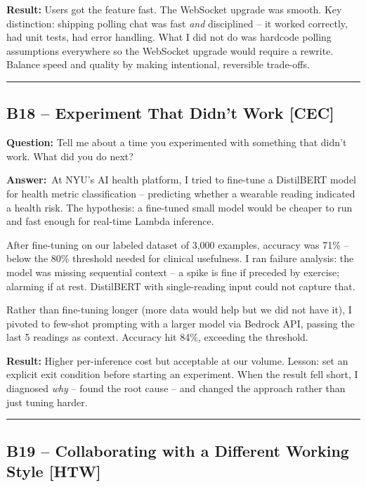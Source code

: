 \documentclass[letterpaper,10pt]{article}
\newlength{\boxwidth}
\newcommand{\bquestionbox}[1]{%
  \vspace{6pt}%
  \noindent\colorbox{bqbg}{%
    \begin{minipage}{\boxwidth}%
      \vspace{3pt}\textbf{\textcolor{orange!70!black}{Question:}} #1\vspace{3pt}%
    \end{minipage}%
  }\vspace{2pt}%
}
\newcommand{\answerlabel}{\noindent\textbf{\textcolor{answerblue}{Answer:}}~}
\begin{document}
\textbf{Result:} Users got the feature fast. The WebSocket upgrade was smooth. Key distinction: shipping polling chat was fast \textit{and} disciplined -- it worked correctly, had unit tests, had error handling. What I did not do was hardcode polling assumptions everywhere so the WebSocket upgrade would require a rewrite. Balance speed and quality by making intentional, reversible trade-offs.

\rule{\linewidth}{0.2pt}

\subsection*{B18 -- Experiment That Didn't Work \textmd{[CEC]}}

\bquestionbox{Tell me about a time you experimented with something that didn't work. What did you do next?}

\answerlabel At NYU's AI health platform, I tried to fine-tune a DistilBERT model for health metric classification -- predicting whether a wearable reading indicated a health risk. The hypothesis: a fine-tuned small model would be cheaper to run and fast enough for real-time Lambda inference.

After fine-tuning on our labeled dataset of 3,000 examples, accuracy was 71\% -- below the 80\% threshold needed for clinical usefulness. I ran failure analysis: the model was missing sequential context -- a spike is fine if preceded by exercise; alarming if at rest. DistilBERT with single-reading input could not capture that.

Rather than fine-tuning longer (more data would help but we did not have it), I pivoted to few-shot prompting with a larger model via Bedrock API, passing the last 5 readings as context. Accuracy hit 84\%, exceeding the threshold.

\textbf{Result:} Higher per-inference cost but acceptable at our volume. Lesson: set an explicit exit condition before starting an experiment. When the result fell short, I diagnosed \textit{why} -- found the root cause -- and changed the approach rather than just tuning harder.

\rule{\linewidth}{0.2pt}

\subsection*{B19 -- Collaborating with a Different Working Style \textmd{[HTW]}}
\end{document}
